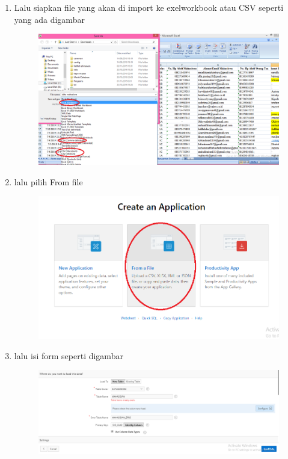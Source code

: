 \begin{enumerate}
	\item Lalu siapkan file yang akan di import ke exelworkbook atau CSV seperti yang ada digambar 
	\begin{figure} [!htbp]
	\includegraphics[scale=0.2]{Apex/32.png}
	\centering
	\end{figure}

\item lalu pilih From file 
	\begin{figure} [!htbp]
	\includegraphics[scale=0.2]{Apex/15.png}
	\centering
	\end{figure}
	
	\item lalu isi form seperti digambar 
	\begin{figure} [!htbp]
	\includegraphics[scale=0.2]{Apex/162.png}
	\centering
	\end{figure}
	

\end{enumerate}
